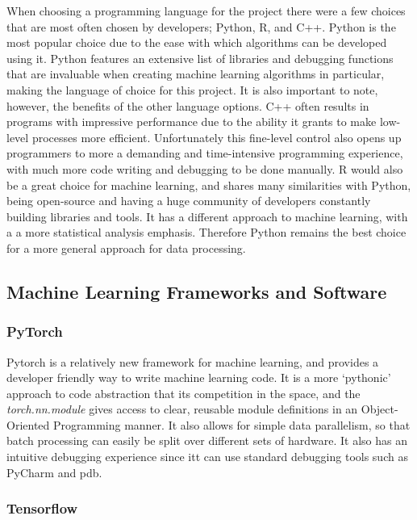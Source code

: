 When choosing a programming language for the project there were a few choices that are most often chosen by developers; Python\cite{Python}, R\cite{R}, and C++\cite{C++}. Python is the most popular choice due to the ease with which algorithms can be developed using it. Python features an extensive list of libraries and debugging functions that are invaluable when creating machine learning algorithms in particular, making the language of choice for this project. It is also important to note, however, the benefits of the other language options. C++ often results in programs with impressive performance due to the ability it grants to make low-level processes more efficient. Unfortunately this fine-level control also opens up programmers to more a demanding and time-intensive programming experience, with much more code writing and debugging to be done manually. R would also be a great choice for machine learning, and shares many similarities with Python, being open-source and having a huge community of developers constantly building libraries and tools. It has a different approach to machine learning, with a a more statistical analysis emphasis. Therefore Python remains the best choice for a more general approach for data processing.

\subsection{Machine Learning Frameworks and Software}

\subsubsection{PyTorch}

Pytorch\cite{Pytorch} is a relatively new framework for machine learning, and provides a developer friendly way to write machine learning code. It is a more `pythonic' approach to code abstraction that its competition in the space, and the \emph{torch.nn.module} gives access to clear, reusable module definitions in an Object-Oriented Programming manner. It also allows for simple data parallelism, so that batch processing can easily be split over different sets of hardware. It also has an intuitive debugging experience since itt can use standard debugging tools such as PyCharm and pdb.

\subsubsection{Tensorflow}

